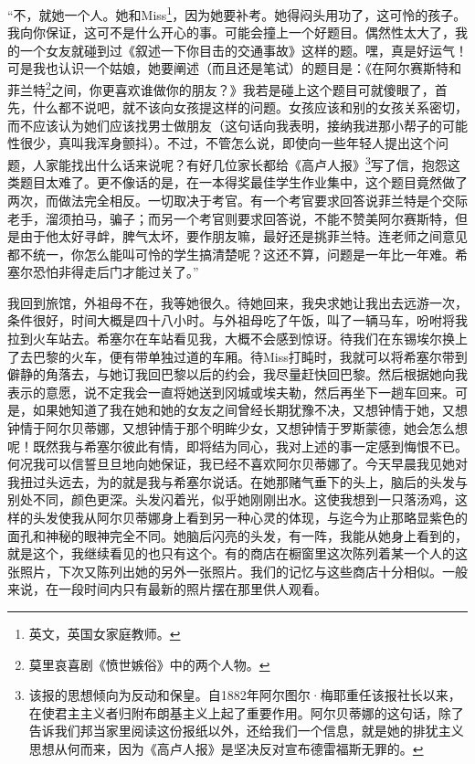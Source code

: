 \par “不，就她一个人。她和Miss\footnote{英文，英国女家庭教师。}，因为她要补考。她得闷头用功了，这可怜的孩子。我向你保证，这可不是什么开心的事。可能会撞上一个好题目。偶然性太大了，我的一个女友就碰到过《叙述一下你目击的交通事故》这样的题。嘿，真是好运气！可是我也认识一个姑娘，她要阐述（而且还是笔试）的题目是：《在阿尔赛斯特和菲兰特\footnote{莫里哀喜剧《愤世嫉俗》中的两个人物。}之间，你更喜欢谁做你的朋友？》我若是碰上这个题目可就傻眼了，首先，什么都不说吧，就不该向女孩提这样的问题。女孩应该和别的女孩关系密切，而不应该认为她们应该找男士做朋友（这句话向我表明，接纳我进那小帮子的可能性很少，真叫我浑身颤抖）。不过，不管怎么说，即使向一些年轻人提出这个问题，人家能找出什么话来说呢？有好几位家长都给《高卢人报》\footnote{该报的思想倾向为反动和保皇。自1882年阿尔图尔·梅耶重任该报社长以来，在使君主主义者归附布朗基主义上起了重要作用。阿尔贝蒂娜的这句话，除了告诉我们邦当家里阅读这份报纸以外，还给我们一个信息，就是她的排犹主义思想从何而来，因为《高卢人报》是坚决反对宣布德雷福斯无罪的。}写了信，抱怨这类题目太难了。更不像话的是，在一本得奖最佳学生作业集中，这个题目竟然做了两次，而做法完全相反。一切取决于考官。有一个考官要求回答说菲兰特是个交际老手，溜须拍马，骗子；而另一个考官则要求回答说，不能不赞美阿尔赛斯特，但是由于他太好寻衅，脾气太坏，要作朋友嘛，最好还是挑菲兰特。连老师之间意见都不统一，你怎么能叫可怜的学生搞清楚呢？这还不算，问题是一年比一年难。希塞尔恐怕非得走后门才能过关了。”
\par 我回到旅馆，外祖母不在，我等她很久。待她回来，我央求她让我出去远游一次，条件很好，时间大概是四十八小时。与外祖母吃了午饭，叫了一辆马车，吩咐将我拉到火车站去。希塞尔在车站看见我，大概不会感到惊讶。待我们在东锡埃尔换上了去巴黎的火车，便有带单独过道的车厢。待Miss打盹时，我就可以将希塞尔带到僻静的角落去，与她订我回巴黎以后的约会，我尽量赶快回巴黎。然后根据她向我表示的意愿，说不定我会一直将她送到冈城或埃夫勒，然后再坐下一趟车回来。可是，如果她知道了我在她和她的女友之间曾经长期犹豫不决，又想钟情于她，又想钟情于阿尔贝蒂娜，又想钟情于那个明眸少女，又想钟情于罗斯蒙德，她会怎么想呢！既然我与希塞尔彼此有情，即将结为同心，我对上述的事一定感到悔恨不已。何况我可以信誓旦旦地向她保证，我已经不喜欢阿尔贝蒂娜了。今天早晨我见她对我扭过头远去，为的就是我与希塞尔说话。在她那赌气垂下的头上，脑后的头发与别处不同，颜色更深。头发闪着光，似乎她刚刚出水。这使我想到一只落汤鸡，这样的头发使我从阿尔贝蒂娜身上看到另一种心灵的体现，与迄今为止那略显紫色的面孔和神秘的眼神完全不同。她脑后闪亮的头发，有一阵，我能从她身上看到的，就是这个，我继续看见的也只有这个。有的商店在橱窗里这次陈列着某一个人的这张照片，下次又陈列出她的另外一张照片。我们的记忆与这些商店十分相似。一般来说，在一段时间内只有最新的照片摆在那里供人观看。
